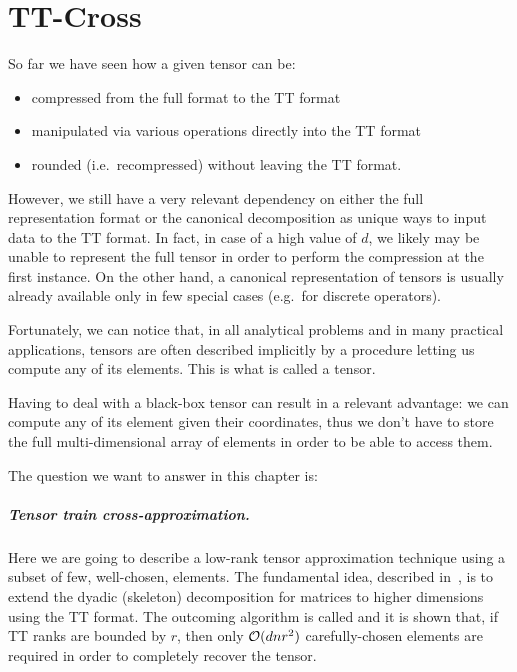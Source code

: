 \chapter{TT-Cross}
So far we have seen how a given tensor can be:
\begin{itemize}
\item compressed from the full format to the TT format
\item manipulated via various operations directly into the TT format
\item rounded (i.e.\ recompressed) without leaving the TT format.
\end{itemize}

However, we still have a very relevant dependency on either the full representation format or the canonical decomposition as unique ways to input data to the TT format.
In fact, in case of a high value of $d$, we likely may be unable to represent the full tensor in order to perform the compression at the first instance. On the other hand, a canonical representation of tensors is usually already available only in few special cases (e.g.\ for discrete operators).

Fortunately, we can notice that, in all analytical problems and in many practical applications, tensors are often described implicitly by a procedure letting us compute any of its elements.
This is what is called a  tensor.

Having to deal with a black-box tensor can result in a relevant advantage: we can compute any of its element given their coordinates, thus we don't have to store the full multi-dimensional array of elements in order to be able to access them.

The question we want to answer in this chapter is: 

\paragraph{Tensor train cross-approximation.}
Here we are going to describe a low-rank tensor approximation technique using a subset of few, well-chosen, elements.
The fundamental idea, described in~\cite{tt-cross}, is to extend the dyadic (skeleton) decomposition for matrices to higher dimensions using the TT format.
The outcoming algorithm is called  and it is shown that, if TT ranks are bounded by $r$, then only $\mathcal{O}(dnr^2)$ carefully-chosen elements are required in order to completely recover the tensor.


